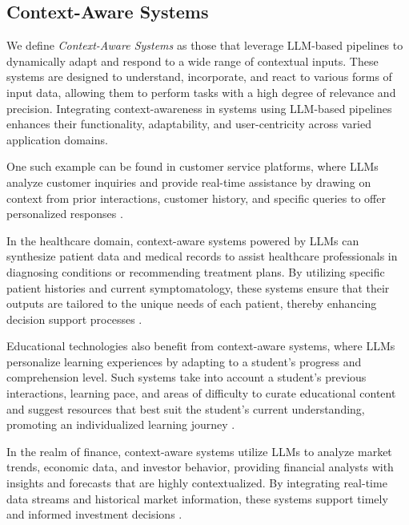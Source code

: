 \subsection{Context-Aware Systems}

We define \textit{Context-Aware Systems} as those that leverage LLM-based pipelines to dynamically adapt and respond to a wide range of contextual inputs. These systems are designed to understand, incorporate, and react to various forms of input data, allowing them to perform tasks with a high degree of relevance and precision. Integrating context-awareness in systems using LLM-based pipelines enhances their functionality, adaptability, and user-centricity across varied application domains.  

One such example can be found in customer service platforms, where LLMs analyze customer inquiries and provide real-time assistance by drawing on context from prior interactions, customer history, and specific queries to offer personalized responses \cite{meinckeReimaginingCustomerService, bommasaniOpportunitiesRisksFoundation2022}.

In the healthcare domain, context-aware systems powered by LLMs can synthesize patient data and medical records to assist healthcare professionals in diagnosing conditions or recommending treatment plans. By utilizing specific patient histories and current symptomatology, these systems ensure that their outputs are tailored to the unique needs of each patient, thereby enhancing decision support processes \cite{munnangiAssessingLimitationsLarge2024}.

Educational technologies also benefit from context-aware systems, where LLMs personalize learning experiences by adapting to a student's progress and comprehension level. Such systems take into account a student's previous interactions, learning pace, and areas of difficulty to curate educational content and suggest resources that best suit the student's current understanding, promoting an individualized learning journey \cite{bommasaniOpportunitiesRisksFoundation2022, liAdaptingLargeLanguage2024}.

In the realm of finance, context-aware systems utilize LLMs to analyze market trends, economic data, and investor behavior, providing financial analysts with insights and forecasts that are highly contextualized. By integrating real-time data streams and historical market information, these systems support timely and informed investment decisions \cite{liLargeLanguageModels2024}.


